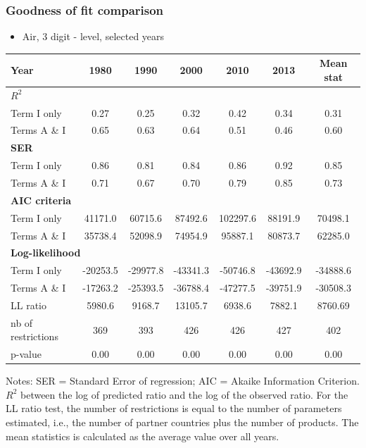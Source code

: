 \documentclass[10 pt,Helvetica, french]{beamer}
\begin{document}
\begin{frame}
\frametitle{Goodness of fit comparison}
\begin{itemize}
\item Air, 3 digit - level, selected years
\end{itemize}
\begin{table}[htbp]
  \centering
  \scriptsize{
\begin{center}
    \begin{tabular}{l|ccccc|c}
    \hline \hline
    Year  &1980  & 1990  & 2000  & 2010 & 2013 & Mean stat \\ \hline
    \multicolumn{7}{l}{\bf{$R^2$} }\\ \hline
    Term I only &  0.27  & 0.25  & 0.32  & 0.42 & 0.34 & 0.31 \\
    Terms A \& I &  0.65  & 0.63  & 0.64  & 0.51 & 0.46 & 0.60 \\ \hline
    \multicolumn{7}{l}{\textbf{SER}  }  \\ \hline
    Term I only &  0.86  & 0.81  & 0.84  & 0.86 & 0.92 & 0.85 \\
    Terms A \& I &  0.71  & 0.67  & 0.70  & 0.79 & 0.85 & 0.73 \\ \hline
   \multicolumn{7}{l}{\textbf{AIC criteria}}  \\ \hline
    Term I only &  41171.0 & 60715.6 & 87492.6 & 102297.6 & 88191.9 & 70498.1 \\
    Terms A \& I & 35738.4 & 52098.9 & 74954.9 & 95887.1 & 80873.7 & 62285.0 \\ \hline
    \multicolumn{7}{l}{\textbf{Log-likelihood}} \\ \hline
    Term I only &  -20253.5 & -29977.8 & -43341.3 & -50746.8 & -43692.9 & -34888.6 \\
    Terms A \& I &  -17263.2 & -25393.5 & -36788.4 & -47277.5 & -39751.9 & -30508.3 \\
    LL ratio &  5980.6 & 9168.7 & 13105.7 & 6938.6 & 7882.1 & 8760.69 \\
    nb of restrictions & 369   & 393   & 426   & 426 & 427 & 402 \\
    p-value & 0.00 & 0.00 & 0.00 & 0.00 & 0.00 & 0.00 \\
    \hline \hline
 \end{tabular}%
    \end{center}}
  \label{tab:good_fit_air}%
 \parbox[l]{10cm}{\tiny{Notes: SER = Standard Error of regression; AIC = Akaike Information Criterion. $R^{2}$ between the log of predicted ratio and the log of the observed ratio. For the LL ratio test, the number of restrictions is equal to the number of parameters estimated, i.e., the number of partner countries plus the number of products. The mean statistics is calculated as the average value over all years. }}
\end{table}%
\end{frame}
\end{document}
